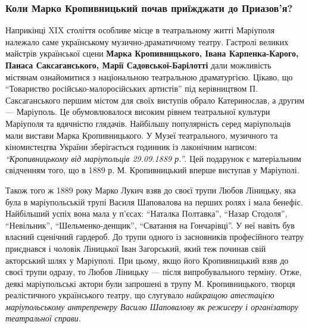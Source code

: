 
\subsubsection{Коли Марко Кропивницький почав приїжджати до Приазов'я?}


Наприкінці XIX століття особливе місце в театральному житті Маріуполя належало
саме українському музично-драматичному театру. Гастролі великих майстрів
української сцени \textbf{Марка Кропивницького, Івана Карпенка-Карого, Панаса
Саксаганського, Марії Садовської-Барілотті} дали можливість містянам
ознайомитися з національною театральною драматургією. Цікаво, що \enquote{Товариство
російсько-малоросійських артистів} під керівництвом П. Саксаганського першим
містом для своїх виступів обрало Катеринослав, а другим — Маріуполь. Це
обумовлювалося високим рівнем театральної культури Маріуполя та вдячністю
глядачів. Найбільшу популярність серед маріупольців мали вистави Марка
Кропивницького. У Музеї театрального, музичного та кіномистецтва України
зберігається годинник із лаконічним написом: \emph{\enquote{Кропивницькому від маріупольців
29.09.1889 р.}}. Цей подарунок є матеріальним свідченням того, що в 1889 р. М.
Кропивницький вперше виступав у Маріуполі.



Також того ж 1889 року Марко Лукич взяв до своєї трупи Любов Ліницьку, яка була
в маріупольській трупі Василя Шаповалова на перших ролях і мала бенефіс.
Найбільший успіх вона мала у п'єсах: \enquote{Наталка Полтавка}, \enquote{Назар Стодоля},
\enquote{Невільник}, \enquote{Шельменко-денщик}, \enquote{Сватання на Гончарівці}. У неї навіть був
власний сценічний гардероб. До трупи одного із засновників професійного театру
приєднався і чоловік Ліницької Іван Загорський, який теж починав свій
акторський шлях у Маріуполі. При цьому, якщо його Кропивницький взяв до своєї
трупи одразу, то Любов Ліницьку — після випробувального терміну. Отже, деякі
маріупольські актори були запрошені в трупу М. Кропивницького, творця
реалістичного українського театру, що слугувало \emph{найкращою атестацією
маріупольському антрепренеру Василю Шаповалову як режисеру і організатору
театральної справи.}


